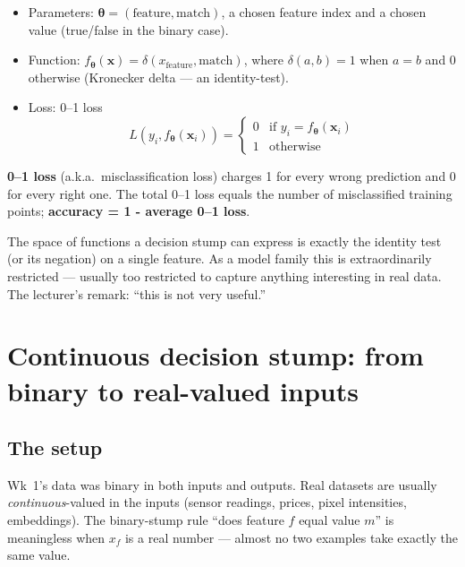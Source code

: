 \documentclass[11pt, a4paper]{article}
\begin{document}
\begin{itemize}
  \item Parameters: $\boldsymbol\theta = (\text{feature}, \text{match})$, a chosen feature index and a chosen value (true/false in the binary case).
  \item Function: $f_{\boldsymbol\theta}(\mathbf{x}) = \delta(x_{\text{feature}}, \text{match})$, where $\delta(a, b) = 1$ when $a = b$ and $0$ otherwise (Kronecker delta — an identity-test).
  \item Loss: 0--1 loss
  \[
  L(y_i, f_{\boldsymbol\theta}(\mathbf{x}_i)) =
  \begin{cases}
    0 & \text{if } y_i = f_{\boldsymbol\theta}(\mathbf{x}_i) \\
    1 & \text{otherwise}
  \end{cases}
  \]
\end{itemize}

\begin{defbox}[0--1 loss]
\textbf{0--1 loss} (a.k.a.\ misclassification loss) charges 1 for every wrong prediction and 0 for every right one. The total 0--1 loss equals the number of misclassified training points; \textbf{accuracy = 1 - average 0--1 loss}.
\end{defbox}

The space of functions a decision stump can express is exactly the identity test (or its negation) on a single feature. As a model family this is extraordinarily restricted — usually too restricted to capture anything interesting in real data. The lecturer's remark: ``this is not very useful.''

\section{Continuous decision stump: from binary to real-valued inputs}

\subsection{The setup}

Wk~1's data was binary in both inputs and outputs. Real datasets are usually \emph{continuous}-valued in the inputs (sensor readings, prices, pixel intensities, embeddings). The binary-stump rule ``does feature $f$ equal value $m$'' is meaningless when $x_f$ is a real number — almost no two examples take exactly the same value.
\end{document}
